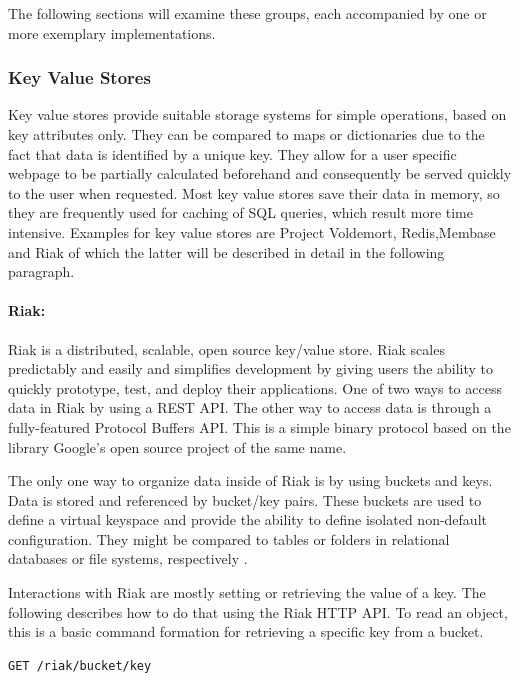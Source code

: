 The following sections will examine these groups, each accompanied by one or more exemplary implementations.      

\subsubsection{Key Value Stores}

Key value stores provide suitable storage systems for simple operations, based on key attributes only. They can be compared to maps or dictionaries due to the fact that data is identified by a unique key. They allow for a user specific webpage to be partially calculated beforehand and consequently be served quickly to the user when requested. Most key value stores save their data in memory, so they are frequently used for caching of SQL queries, which result more time intensive. Examples for key value stores are Project Voldemort, Redis,Membase and Riak of which the latter will be described in detail in the following paragraph.

\paragraph{Riak:} Riak is a distributed, scalable, open source key/value store. Riak scales predictably and easily and simplifies development by giving users the ability to quickly prototype, test, and deploy their applications. One of two ways to access data in Riak by using a REST API. The other way to access data is through a fully-featured Protocol Buffers API. This is a simple binary protocol based on the library Google's open source project of the same name.

The only one way to organize data inside of Riak is by using buckets and keys. Data is stored and referenced by bucket/key pairs. These buckets are used to define a virtual keyspace and provide the ability to define isolated non-default configuration. They might be compared to tables or folders in relational databases or file systems, respectively \cite{Riak:Buckets}.

Interactions with Riak are mostly setting or retrieving the value of a key. The following describes how to do that using the Riak HTTP API. To read an object, this is a basic command formation for retrieving a specific key from a bucket. 

\begin{code}
\begin{verbatim}
GET /riak/bucket/key
\end{verbatim}
\label{lst:riak_get}
\end{code}

